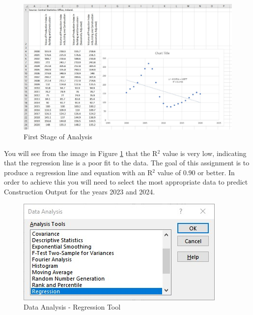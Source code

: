 \begin{figure}
	\centering
	\includegraphics[width=1.0\linewidth]{./img/Excel1.jpg}
	\caption{First Stage of Analysis}
	\label{fig:Excel1}
\end{figure}

You will see from the image in Figure \ref{fig:Excel1} that the R$^{2}$ value is very low, indicating that the regression line is a poor fit to the data.  The goal of this assignment is to produce a regression line and equation with an R$^{2}$ value of 0.90 or better.  In order to achieve this you will need to select the most appropriate data to predict Construction Output for the years 2023 and 2024.\\

\begin{figure}
	\centering
	\includegraphics[width=0.8\linewidth]{./img/DataAnalysisWindow.jpg}
	\caption{Data Analysis - Regression Tool}
	\label{fig:DataAnalysisWindow}
\end{figure}



